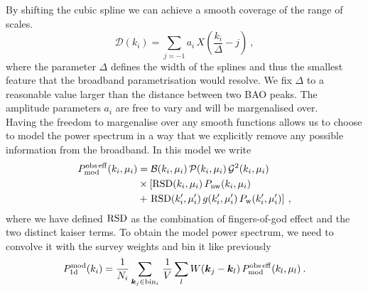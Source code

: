 \documentclass{article}
\begin{document}
    By shifting the cubic spline we can achieve a smooth coverage of the range of scales.
    \begin{equation}
        \mathcal{D}(k_i) = \sum_{j=-1} a_i\,X\left(\frac{k_i}{\Delta}-j\right)\:,
    \end{equation}
    where the parameter $\Delta$ defines the width of the splines and thus the smallest feature that the broadband parametrisation would resolve. We fix $\Delta$ to a reasonable value larger than the distance between two BAO peaks. The amplitude parameters $a_i$ are free to vary and will be margenalised over.\\
    Having the freedom to margenalise over any smooth functions allows us to choose to model the power spectrum in a way that we explicitly remove any possible information from the broadband. In this model we write
    \begin{align}
        P^{\rm obs\,eff}_{\rm mod}(k_i, \mu_i) &= \mathcal{B}(k_i, \mu_i)\, \mathcal{P}(k_i, \mu_i)\, \mathcal{G}^2(k_i, \mu_i) \nonumber\\
        &\times \left[\mathrm{RSD}(k_i, \mu_i)\,P_{\rm nw}(k_i, \mu_i)\right.\nonumber\\
        &+\left.\mathrm{RSD}(k'_i, \mu'_i)\,g(k'_i, \mu'_i)\,P_{\rm w}(k'_i, \mu'_i)\right]\:,
    \end{align}
    where we have defined ${\rm RSD}$ as the combination of fingers-of-god effect and the two distinct kaiser terms. To obtain the model power spectrum, we need to convolve it with the survey weights and bin it like previously
    \begin{equation}
        P_{\rm 1d}^{\rm mod}(k_i) = \frac{1}{N_i}\sum_{\boldsymbol{k}_j \in \text{bin}_i}\,\frac{1}{V}\sum_{l}W(\boldsymbol{k}_j - \boldsymbol{k}_l)\,P^{\rm obs\, eff}_{\rm mod}(k_l, \mu_l)\:.
    \end{equation}
\end{document}
